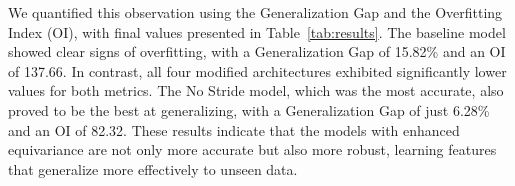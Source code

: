 \documentclass[conference]{IEEEtran}
\begin{document}
We quantified this observation using the Generalization Gap and the Overfitting Index (OI), with final values presented in Table~\ref{tab:results}. The baseline model showed clear signs of overfitting, with a Generalization Gap of 15.82\% and an OI of 137.66. In contrast, all four modified architectures exhibited significantly lower values for both metrics. The No Stride model, which was the most accurate, also proved to be the best at generalizing, with a Generalization Gap of just 6.28\% and an OI of 82.32. These results indicate that the models with enhanced equivariance are not only more accurate but also more robust, learning features that generalize more effectively to unseen data.





\end{document}
